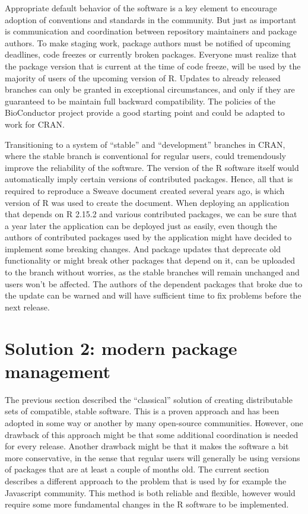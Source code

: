 Appropriate default behavior of the software is a key element to encourage
adoption of conventions and standards in the community. But just as important is
communication and coordination between repository maintainers and package authors.
To make staging work, package authors must be notified of upcoming deadlines,
code freezes or currently broken packages. Everyone must realize that the
package version that is current at the time of code freeze, will be used by the
majority of users of the upcoming version of R. Updates to already released
branches can only be granted in exceptional circumstances, and only if they are
guaranteed to be maintain full backward compatibility. The policies of the
BioConductor project provide a good starting point and could be adapted to work
for CRAN.

Transitioning to a system of ``stable'' and ``development'' branches in CRAN,
where the stable branch is conventional for regular users, could tremendously
improve the reliability of the software. The version of the R software itself
would automatically imply certain versions of contributed packages. Hence, all
that is required to reproduce a Sweave document created several years ago, is
which version of R was used to create the document. When deploying an
application that depends on R 2.15.2 and various contributed packages, we can
be sure that a year later the application can be deployed just as easily, even
though the authors of contributed packages used by the application might have
decided to implement some breaking changes.
And package updates that deprecate old functionality or might break other
packages that depend on it, can be uploaded to the  branch
without worries, as the stable branches will remain unchanged and users won't
be affected. The authors of the dependent packages that broke due to the update
can be warned and will have sufficient time to fix problems before the next
 release.

\section{Solution 2: modern package management}


The previous section described the ``classical'' solution of creating distributable
sets of compatible, stable software. This is a proven approach and has been
adopted in some way or another by many open-source communities. However, one
drawback of this approach might be that some additional coordination is needed
for every release. Another drawback might be that it makes the software a bit
more conservative, in the sense that regular users will generally be using
versions of packages that are at least a couple of months old. The current
section describes a different approach to the problem that is used by for
example the Javascript community. This method is both reliable and flexible,
however would require some more fundamental changes in the R software to be
implemented.

